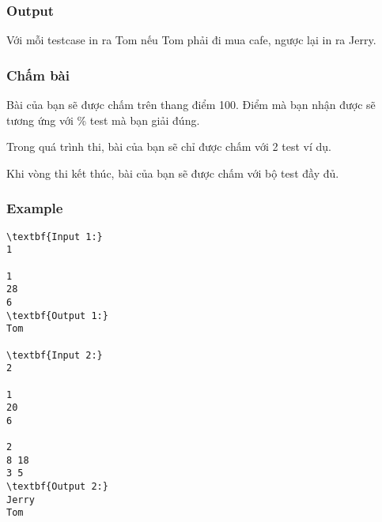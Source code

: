 \subsubsection{Output}

Với mỗi testcase in ra Tom nếu Tom phải đi mua cafe, ngược lại in ra Jerry.

\subsubsection{Chấm bài}

Bài của bạn sẽ được chấm trên thang điểm 100. Điểm mà bạn nhận được sẽ tương ứng với \% test mà bạn giải đúng.

Trong quá trình thi, bài của bạn sẽ chỉ được chấm với 2 test ví dụ.

Khi vòng thi kết thúc, bài của bạn sẽ được chấm với bộ test đầy đủ.

\subsubsection{Example}
\begin{verbatim}
\textbf{Input 1:}
1

1
28
6
\textbf{Output 1:}
Tom

\textbf{Input 2:}
2

1
20
6

2
8 18
3 5
\textbf{Output 2:}
Jerry
Tom\end{verbatim}
